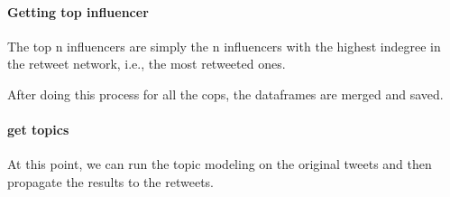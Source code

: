 \paragraph{Getting top influencer}
The top n influencers are simply the n influencers with the highest indegree in the retweet network, i.e., the most retweeted ones.


After doing this process for all the cops, the dataframes are merged and saved.

\paragraph{get topics}
At this point, we can run the topic modeling on the original tweets and then propagate the results to the retweets. 
